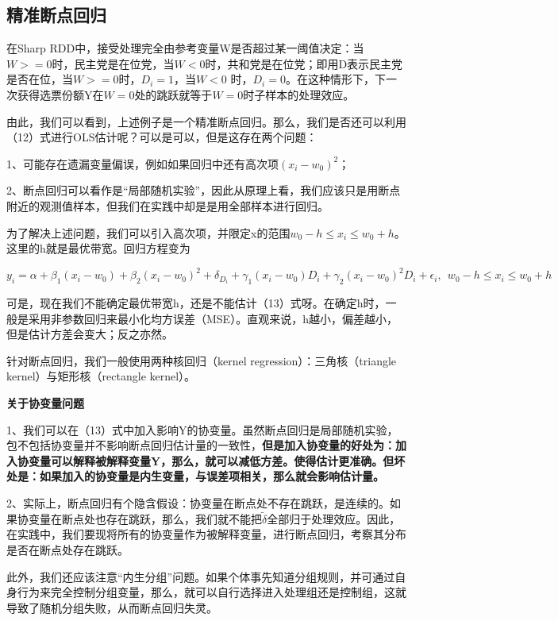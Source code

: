 \documentclass[cn,12pt,math=newtx,citestyle=gb7714-2015,bibstyle=gb7714-2015]{elegantbook}
\begin{document}
	\subsection{精准断点回归}
	
	在Sharp RDD中，接受处理完全由参考变量W是否超过某一阈值决定：当$W>=0$时，民主党是在位党，当$W<0$时，共和党是在位党；即用D表示民主党是否在位，当$W>=0$时，$D_i=1$，当$W<0$ 时，$D_i=0$。在这种情形下，下一次获得选票份额Y在$W=0$处的跳跃就等于$W=0$时子样本的处理效应。
	
	由此，我们可以看到，上述例子是一个精准断点回归。那么，我们是否还可以利用（12）式进行OLS估计呢？可以是可以，但是这存在两个问题：
	
	1、可能存在遗漏变量偏误，例如如果回归中还有高次项$(x_i-w_0)^2$；
	
	2、断点回归可以看作是“局部随机实验”，因此从原理上看，我们应该只是用断点附近的观测值样本，但我们在实践中却是是用全部样本进行回归。
	
	为了解决上述问题，我们可以引入高次项，并限定x的范围$w_0-h\le{x_i}\le{w_0+h}$。这里的h就是最优带宽。回归方程变为
	
	\begin{equation}
		y_i=\alpha+\beta_1(x_i-w_0)+\beta_2(x_i-w_0)^2+\delta_{D_i}+\gamma_1(x_i-w_0)D_i+\gamma_2(x_i-w_0)^2D_i+\epsilon_i,~~w_0-h\le{x_i}\le{w_0+h}
	\end{equation}
	
	可是，现在我们不能确定最优带宽h，还是不能估计（13）式呀。在确定h时，一般是采用非参数回归来最小化均方误差（MSE）。直观来说，h越小，偏差越小，但是估计方差会变大；反之亦然。
	
	针对断点回归，我们一般使用两种核回归（kernel regression）：三角核（triangle kernel）与矩形核（rectangle kernel）。
	
	\textbf{关于协变量问题}
	
	1、我们可以在（13）式中加入影响Y的协变量。虽然断点回归是局部随机实验，包不包括协变量并不影响断点回归估计量的一致性，\textbf{但是加入协变量的好处为：加入协变量可以解释被解释变量Y，那么，就可以减低方差。使得估计更准确。但坏处是：如果加入的协变量是内生变量，与误差项相关，那么就会影响估计量。}
	
	2、实际上，断点回归有个隐含假设：协变量在断点处不存在跳跃，是连续的。如果协变量在断点处也存在跳跃，那么，我们就不能把$\tilde{\delta}$全部归于处理效应。因此，在实践中，我们要现将所有的协变量作为被解释变量，进行断点回归，考察其分布是否在断点处存在跳跃。
	
	此外，我们还应该注意“内生分组”问题。如果个体事先知道分组规则，并可通过自身行为来完全控制分组变量，那么，就可以自行选择进入处理组还是控制组，这就导致了随机分组失败，从而断点回归失灵。
	
\end{document}
